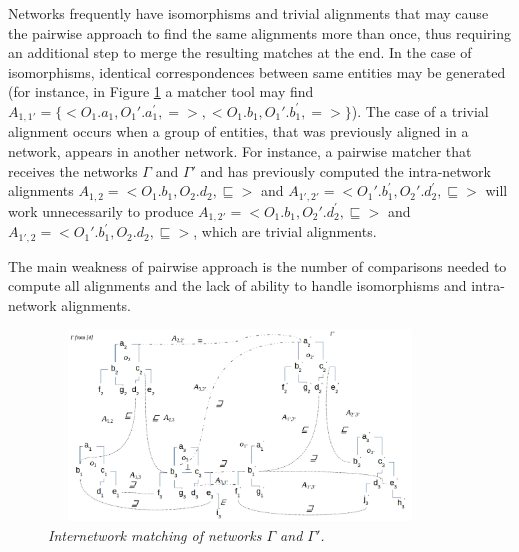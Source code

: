 \documentclass{llncs}
\begin{document}
Networks frequently have isomorphisms and trivial alignments that may cause the pairwise approach to find the same alignments more than once, thus requiring an additional step to merge the resulting matches at the end. In the case of isomorphisms, identical correspondences between same entities may be generated (for instance, in Figure \ref{fig:interNoN} a matcher tool may find  $A_{1,1'} = \{<O_1.a_{1}, O_1'.a^{'}_{1}, = >, <O_1.b_{1}, O_1'.b^{'}_{1}, = >\}$). The case of a trivial alignment occurs when a group of entities, that was previously aligned in a network, appears in another network. For instance, a pairwise matcher that receives the networks $\Gamma$ and $\Gamma'$  and has previously computed the intra-network alignments $A_{1,2} = <O_1.b_{1}, O_2.d_{2}, \sqsubseteq>$ and $A_{1',2'} = <O_1'.b^{'}_{1}, O_2'.d^{'}_{2}, \sqsubseteq>$ will work unnecessarily to produce $A_{1,2'} = <O_1.b_{1}, O_2'.d^{'}_{2}, \sqsubseteq>$ and $A_{1',2} = <O_1'.b^{'}_{1}, O_2.d_{2}, \sqsubseteq>$, which are trivial alignments.

The main weakness of pairwise approach is the number of comparisons needed to compute all alignments and the lack of ability to handle isomorphisms and intra-network alignments. 

\begin{figure}  
\begin{center}  
\includegraphics[height=2in,width=4in,angle=0]{NoNExample4.png}  
\caption{\small \sl Internetwork matching of networks $\Gamma$ and $\Gamma'$.\label{fig:interNoN}}  
\end{center}  
\end{figure}

\end{document}
